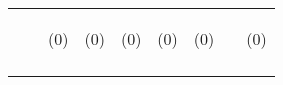 \begin{tabular}{lcccccccc}
 & \begin{footnotesize}\end{footnotesize} & \begin{footnotesize}(0)\end{footnotesize} & \begin{footnotesize}(0)\end{footnotesize} & \begin{footnotesize}(0)\end{footnotesize} & \begin{footnotesize}(0)\end{footnotesize} & \begin{footnotesize}(0)\end{footnotesize} & \begin{footnotesize}\end{footnotesize} & \begin{footnotesize}(0)\end{footnotesize}\\
\noalign{\smallskip}\hline\end{tabular}\\
